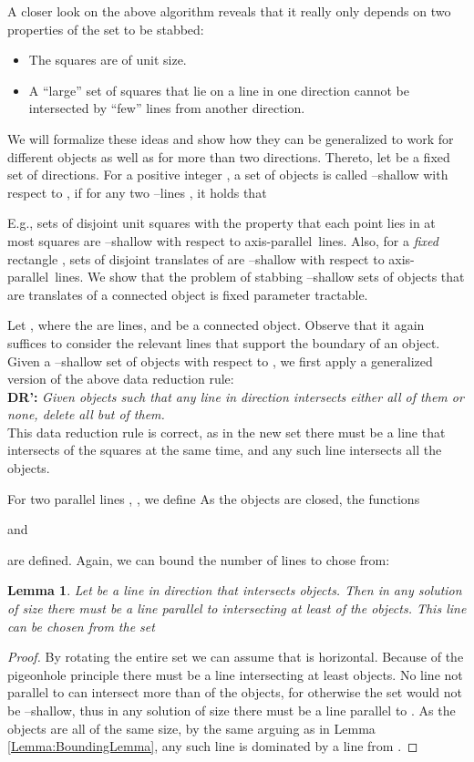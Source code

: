 \documentclass[12pt]{article}
\newtheorem{lemma}[definition]{Lemma}
\newcommand{\ap}{a.p.\ }
\renewcommand{\ap}{axis-parallel\ }
\begin{document}
A closer look on the above algorithm reveals that it really only depends on two properties of the set to be stabbed:
\begin{itemize}
	\item The squares are of unit size.
	\item A ``large'' set of squares that lie on a line in one direction cannot be intersected by ``few'' lines from another direction.
\end{itemize}
We will formalize these ideas and show how they can be generalized to work for different objects as well as for more than two directions. Thereto, let  be a fixed set of directions. For a positive integer , a set of objects is called --shallow with respect to , if for any two --lines ,  it holds that

E.g., sets of disjoint unit squares with the property that each point lies
in at most  squares are --shallow with respect to \ap lines. Also,
for a \emph{fixed} rectangle , sets of disjoint translates of  are
--shallow with respect to \ap lines. 
We show that the problem of stabbing --shallow sets of objects that are translates of a connected object is fixed parameter tractable.

Let , where the  are lines, and  be a connected object. Observe that it again suffices to consider the  relevant lines that support the boundary of an object.
Given a --shallow set of objects with respect to , we first apply a generalized version of the above data reduction rule:\\
\textbf{DR': } 
\emph{Given  objects such that any line in direction  intersects either all of them or none, delete all but  of them.}\\
This data reduction rule is correct, as in the new set there must be a line that intersects  of the squares at the same time, and any such line intersects all the  objects.

For two parallel lines , , we define  As the objects are closed, the functions 

and 
 
are defined. Again, we can bound the number of lines to chose from:
\begin{lemma}\label{Lemma:BranchingNew} Let  be a line in direction  that intersects  objects. Then in any solution of size  there must be a line  parallel to  intersecting at least  of the objects. This line can be chosen from the set

\end{lemma}
\begin{proof}
By rotating the entire set we can assume that  is horizontal. Because of the pigeonhole principle there must be a line intersecting at least  objects. No line not parallel to  can intersect more than  of the objects, for otherwise the set would not be --shallow, thus in any solution of size  there must be a line parallel to . As the objects are all of the same size, by the same arguing as in Lemma \ref{Lemma:BoundingLemma}, any such line is dominated by a line from . 
\end{proof}
\end{document}
